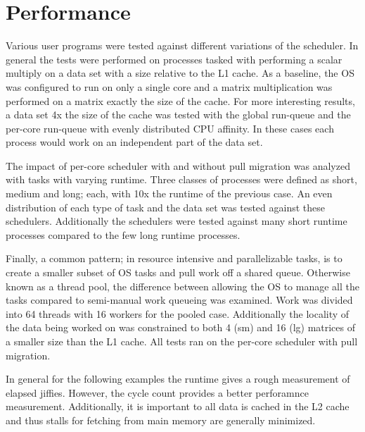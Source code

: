 \documentclass[11pt, twocolumn]{proc}
\begin{document}
\section{Performance}
\label{sec:performance}
Various user programs were tested against different variations of the scheduler.  In general the tests were performed on processes tasked with performing a scalar multiply on a data set with a size relative to the L1 cache.  As a baseline, the OS was configured to run on only a single core and a matrix multiplication was performed on a matrix exactly the size of the cache.  For more interesting results, a data set 4x the size of the cache was tested with the global run-queue and the per-core run-queue with evenly distributed CPU affinity.  In these cases each process would work on an independent part of the data set.  

The impact of per-core scheduler with and without pull migration was analyzed with tasks with varying runtime.  Three classes of processes were defined as short, medium and long; each, with 10x the runtime of the previous case.  An even distribution of each type of task and the data set was tested against these schedulers.  Additionally the schedulers were tested against many short runtime processes compared to the few long runtime processes.

Finally, a common pattern; in resource intensive and parallelizable tasks, is to create a smaller subset of OS tasks and pull work off a shared queue.  Otherwise known as a thread pool, the difference between allowing the OS to manage all the tasks compared to semi-manual work queueing was examined.  Work was divided into 64 threads with 16 workers for the pooled case.  Additionally the locality of the data being worked on was constrained to both 4 (sm) and 16 (lg) matrices of a smaller size than the L1 cache.  All tests ran on the per-core scheduler with pull migration.  

In general for the following examples the runtime gives a rough measurement of elapsed jiffies.  However, the cycle count provides a better perforamnce measurement.  Additionally, it is important to all data is cached in the L2 cache and thus stalls for fetching from main memory are generally minimized.

\begin{table}[h!]
    \centering
    \caption{single core - matrix 1x utilization}
\end{table}
\end{document}
